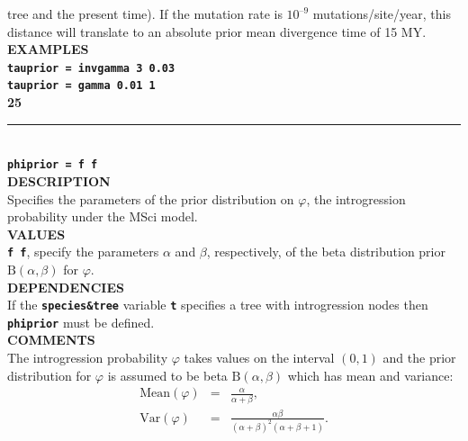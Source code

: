 \documentclass{book}
\numberwithin{equation}{section} \renewcommand{\baselinestretch}{0.55}
\begin{document}
tree and the present time).  If the mutation rate is $10^{–9}$
mutations/site/year, this distance will translate to an
absolute prior mean divergence time of 15 MY. \vspace{5pt}\\
\textbf{EXAMPLES} \vspace{5pt}\\
\textbf{\texttt{tauprior = invgamma 3 0.03}} \vspace{5pt}\\
\textbf{\texttt{tauprior = gamma 0.01 1}}\vspace{10pt}\\
\textbf{{\large 25}} \\
\noindent\rule{\textwidth}{0.8pt} \\
\textbf{{\Large \texttt{phiprior = f f}}} \vspace{5pt}\\
\textbf{DESCRIPTION} \vspace{5pt}\\
Specifies the parameters of the prior distribution on $\varphi$, the
introgression probability under the MSci model.
\vspace{5pt}\\
\textbf{VALUES} \vspace{5pt}\\
\textbf{\texttt{f f}}, specify the parameters $\alpha$ and $\beta$, respectively, of the beta distribution prior $\textrm{B}(\alpha,\beta)$ for $\varphi$. \vspace{5pt}\\
\textbf{DEPENDENCIES} \vspace{5pt}\\
If the \textbf{\texttt{species\&tree}} variable \textbf{\texttt{t}}
specifies a tree with introgression nodes then
\textbf{\texttt{phiprior}} must be defined.
\vspace{5pt}\\
\textbf{COMMENTS} \vspace{5pt}\\
The introgression probability $\varphi$ takes values on the interval
$(0,1)$ and the prior distribution for $\varphi$ is assumed to be beta
$\textrm{B}(\alpha, \beta)$ which has mean and variance:
\begin{eqnarray}
  \textrm{Mean}(\varphi) & = & \frac{\alpha}{\alpha+\beta}, \nonumber \\
  \textrm{Var}(\varphi) & = & \frac{\alpha \beta}{(\alpha + \beta)^2 (\alpha + \beta + 1)}. \nonumber
\end{eqnarray}
\end{document}
